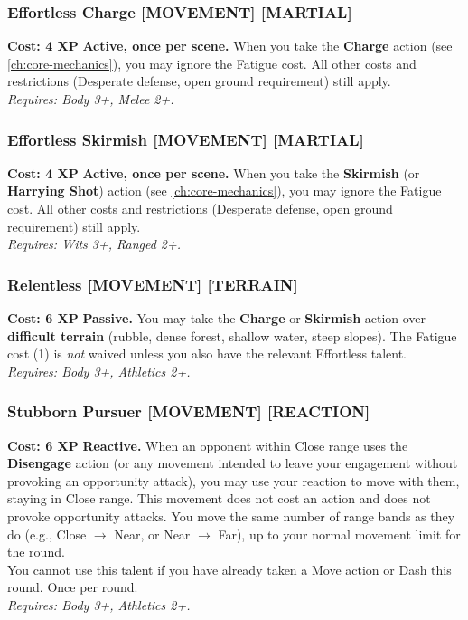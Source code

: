 \subsubsection*{Effortless Charge \textnormal{[MOVEMENT] [MARTIAL]}}
\label{talent:effortless-charge}
\textbf{Cost: 4 XP} \textbf{Active, once per scene.} When you take the \textbf{Charge} action (see \ref{ch:core-mechanics}), you may ignore the Fatigue cost. All other costs and restrictions (Desperate defense, open ground requirement) still apply. \\
\textit{Requires: Body 3+, Melee 2+.}

\subsubsection*{Effortless Skirmish \textnormal{[MOVEMENT] [MARTIAL]}}
\label{talent:effortless-skirmish}
\textbf{Cost: 4 XP} \textbf{Active, once per scene.} When you take the \textbf{Skirmish} (or \textbf{Harrying Shot}) action (see \ref{ch:core-mechanics}), you may ignore the Fatigue cost. All other costs and restrictions (Desperate defense, open ground requirement) still apply. \\
\textit{Requires: Wits 3+, Ranged 2+.}

\subsubsection*{Relentless \textnormal{[MOVEMENT] [TERRAIN]}}
\label{talent:relentless}
\textbf{Cost: 6 XP} \textbf{Passive.} You may take the \textbf{Charge} or \textbf{Skirmish} action over \textbf{difficult terrain} (rubble, dense forest, shallow water, steep slopes). The Fatigue cost (1) is \emph{not} waived unless you also have the relevant Effortless talent. \\
\textit{Requires: Body 3+, Athletics 2+.}

\subsubsection*{Stubborn Pursuer \textnormal{[MOVEMENT] [REACTION]}}
\label{talent:stubborn-pursuer}
\textbf{Cost: 6 XP} \textbf{Reactive.} When an opponent within Close range uses the \textbf{Disengage} action (or any movement intended to leave your engagement without provoking an opportunity attack), you may use your reaction to move with them, staying in Close range. This movement does not cost an action and does not provoke opportunity attacks. You move the same number of range bands as they do (e.g., Close $\rightarrow$ Near, or Near $\rightarrow$ Far), up to your normal movement limit for the round. \\
You cannot use this talent if you have already taken a Move action or Dash this round. Once per round. \\
\textit{Requires: Body 3+, Athletics 2+.}

